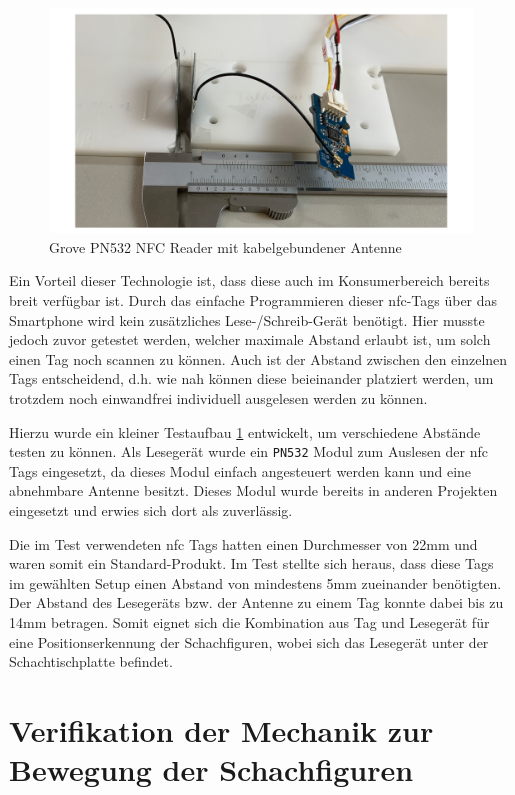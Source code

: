 \begin{figure}
\centering
\includegraphics{images/ATC_nfc_range_test.png}
\caption{Grove PN532 NFC Reader mit kabelgebundener Antenne
\label{ATC_nfc_range_test}}
\end{figure}

Ein Vorteil dieser Technologie ist, dass diese auch im Konsumerbereich
bereits breit verfügbar ist. Durch das einfache Programmieren dieser
\gls{nfc}-Tags über das Smartphone wird kein zusätzliches
Lese-/Schreib-Gerät benötigt. Hier musste jedoch zuvor getestet werden,
welcher maximale Abstand erlaubt ist, um solch einen Tag noch scannen zu
können. Auch ist der Abstand zwischen den einzelnen Tags entscheidend,
d.h. wie nah können diese beieinander platziert werden, um trotzdem noch
einwandfrei individuell ausgelesen werden zu können.

Hierzu wurde ein kleiner Testaufbau \ref{ATC_nfc_range_test} entwickelt,
um verschiedene Abstände testen zu können. Als Lesegerät wurde ein
\passthrough{\lstinline!PN532!} Modul zum Auslesen der \gls{nfc} Tags
eingesetzt, da dieses Modul einfach angesteuert werden kann und eine
abnehmbare Antenne besitzt. Dieses Modul wurde bereits in anderen
Projekten eingesetzt und erwies sich dort als zuverlässig.

Die im Test verwendeten \gls{nfc} Tags hatten einen Durchmesser von 22mm
und waren somit ein Standard-Produkt. Im Test stellte sich heraus, dass
diese Tags im gewählten Setup einen Abstand von mindestens 5mm
zueinander benötigten. Der Abstand des Lesegeräts bzw. der Antenne zu
einem Tag konnte dabei bis zu 14mm betragen. Somit eignet sich die
Kombination aus Tag und Lesegerät für eine Positionserkennung der
Schachfiguren, wobei sich das Lesegerät unter der Schachtischplatte
befindet.

\hypertarget{verifikation-der-mechanik-zur-bewegung-der-schachfiguren}{%
\section{Verifikation der Mechanik zur Bewegung der
Schachfiguren}\label{verifikation-der-mechanik-zur-bewegung-der-schachfiguren}}

